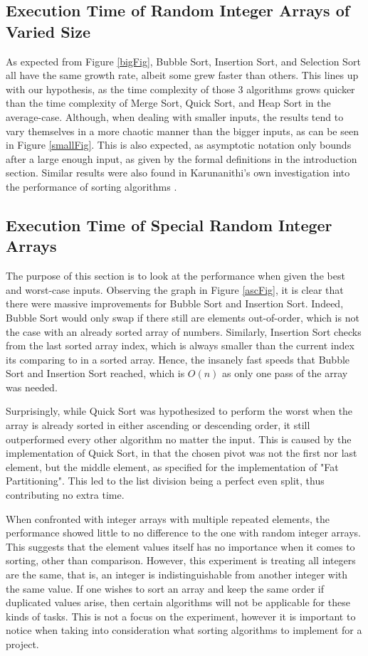 \documentclass{report}
\begin{document}
\subsection{Execution Time of Random Integer Arrays of Varied Size}
As expected from Figure \ref{bigFig}, Bubble Sort, Insertion Sort, and Selection Sort all have the same growth rate, albeit some grew faster than others. This lines up with our hypothesis, as the time complexity of those 3 algorithms grows quicker than the time complexity of Merge Sort, Quick Sort, and Heap Sort in the average-case. Although, when dealing with smaller inputs, the results tend to vary themselves in a more chaotic manner than the bigger inputs, as can be seen in Figure \ref{smallFig}. This is also expected, as asymptotic notation only bounds after a large enough input, as given by the formal definitions in the introduction section. Similar results were also found in Karunanithi's own investigation into the performance of sorting algorithms \autocite{karunanithi2014survey}.

\subsection{Execution Time of Special Random Integer Arrays}
The purpose of this section is to look at the performance when given the best and worst-case inputs. Observing the graph in Figure \ref{ascFig}, it is clear that there were massive improvements for Bubble Sort and Insertion Sort. Indeed, Bubble Sort would only swap if there still are elements out-of-order, which is not the case with an already sorted array of numbers. Similarly, Insertion Sort checks from the last sorted array index, which is always smaller than the current index its comparing to in a sorted array. Hence, the insanely fast speeds that Bubble Sort and Insertion Sort reached, which is $O(n)$ as only one pass of the array was needed.

Surprisingly, while Quick Sort was hypothesized to perform the worst when the array is already sorted in either ascending or descending order, it still outperformed every other algorithm no matter the input. This is caused by the implementation of Quick Sort, in that the chosen pivot was not the first nor last element, but the middle element, as specified for the implementation of "Fat Partitioning". This led to the list division being a perfect even split, thus contributing no extra time.

When confronted with integer arrays with multiple repeated elements, the performance showed little to no difference to the one with random integer arrays. This suggests that the element values itself has no importance when it comes to sorting, other than comparison. However, this experiment is treating all integers are the same, that is, an integer is indistinguishable from another integer with the same value. If one wishes to sort an array and keep the same order if duplicated values arise, then certain algorithms will not be applicable for these kinds of tasks. This is not a focus on the experiment, however it is important to notice when taking into consideration what sorting algorithms to implement for a project.
\end{document}
